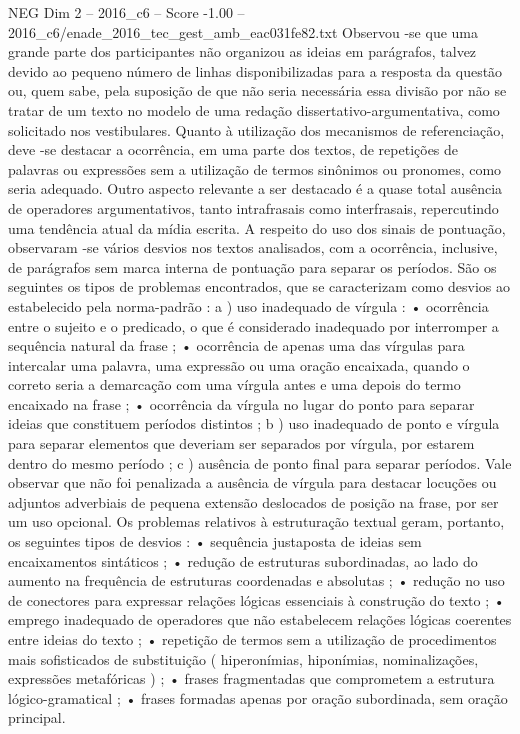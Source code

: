 \begin{textsample}{NEG Dim 2 – 2016\_c6 – Score -1.00 – 2016\_c6/enade\_2016\_tec\_gest\_amb\_eac031fe82.txt}
Observou -se que uma grande parte dos participantes não organizou as ideias em parágrafos, talvez devido ao pequeno número de linhas disponibilizadas para a resposta da questão ou, quem sabe, pela suposição de que não seria necessária essa divisão por não se tratar de um texto no modelo de uma redação dissertativo-argumentativa, como solicitado nos vestibulares.
Quanto à utilização dos mecanismos de referenciação, deve -se destacar a ocorrência, em uma parte dos textos, de repetições de palavras ou expressões sem a utilização de termos sinônimos ou pronomes, como seria adequado.
Outro aspecto relevante a ser destacado é a quase total ausência de operadores argumentativos, tanto intrafrasais como interfrasais, repercutindo uma tendência atual da mídia escrita.
A respeito do uso dos sinais de pontuação, observaram -se vários desvios nos textos analisados, com a ocorrência, inclusive, de parágrafos sem marca interna de pontuação para separar os períodos.
São os seguintes os tipos de problemas encontrados, que se caracterizam como desvios ao estabelecido pela norma-padrão : a ) uso inadequado de vírgula : • ocorrência entre o sujeito e o predicado, o que é considerado inadequado por interromper a sequência natural da frase ; • ocorrência de apenas uma das vírgulas para intercalar uma palavra, uma expressão ou uma oração encaixada, quando o correto seria a demarcação com uma vírgula antes e uma depois do termo encaixado na frase ; • ocorrência da vírgula no lugar do ponto para separar ideias que constituem períodos distintos ; b ) uso inadequado de ponto e vírgula para separar elementos que deveriam ser separados por vírgula, por estarem dentro do mesmo período ; c ) ausência de ponto final para separar períodos.
Vale observar que não foi penalizada a ausência de vírgula para destacar locuções ou adjuntos adverbiais de pequena extensão deslocados de posição na frase, por ser um uso opcional.
Os problemas relativos à estruturação textual geram, portanto, os seguintes tipos de desvios : • sequência justaposta de ideias sem encaixamentos sintáticos ; • redução de estruturas subordinadas, ao lado do aumento na frequência de estruturas coordenadas e absolutas ; • redução no uso de conectores para expressar relações lógicas essenciais à construção do texto ; • emprego inadequado de operadores que não estabelecem relações lógicas coerentes entre ideias do texto ; • repetição de termos sem a utilização de procedimentos mais sofisticados de substituição ( hiperonímias, hiponímias, nominalizações, expressões metafóricas ) ; • frases fragmentadas que comprometem a estrutura lógico-gramatical ; • frases formadas apenas por oração subordinada, sem oração principal.

\end{textsample}
